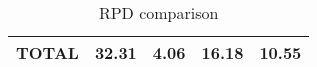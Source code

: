 \begin{table}[]
\begin{tabular}{|c|c|c|c|c|}
\multicolumn{1}{|l|}{\textbf{TOTAL}}                                                    & \textbf{32.31}                                                                             & \textbf{4.06}                                                                                         & \textbf{16.18}                                                                                           & \textbf{10.55}                                                                                            \\ \hline
\end{tabular}
\caption{RPD comparison}
\label{tblRpdComparison}
\end{table}